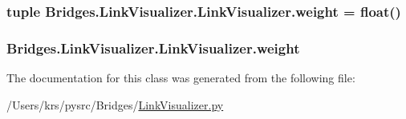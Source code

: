 \subsubsection[{weight}]{\setlength{\rightskip}{0pt plus 5cm}tuple Bridges.\+Link\+Visualizer.\+Link\+Visualizer.\+weight = float()\hspace{0.3cm}{\ttfamily [static]}}\label{class_bridges_1_1_link_visualizer_1_1_link_visualizer_acb4588c51b64630c064a36f023e967ca}
\hypertarget{class_bridges_1_1_link_visualizer_1_1_link_visualizer_ad2d0f7c83100350d7d38e5eb46527f34}{}
\subsubsection[{weight}]{\setlength{\rightskip}{0pt plus 5cm}Bridges.\+Link\+Visualizer.\+Link\+Visualizer.\+weight}\label{class_bridges_1_1_link_visualizer_1_1_link_visualizer_ad2d0f7c83100350d7d38e5eb46527f34}


The documentation for this class was generated from the following file\+:\begin{DoxyCompactItemize}
\item 
/\+Users/krs/pysrc/\+Bridges/\hyperlink{_link_visualizer_8py}{Link\+Visualizer.\+py}\end{DoxyCompactItemize}
